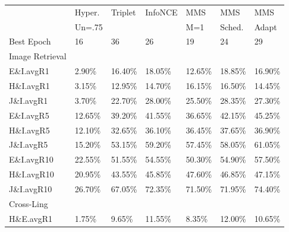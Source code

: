 
\begin{table}
    \centering
\begin{tabular}{l|llllll}
\toprule
{} & Hyper. & Triplet & InfoNCE & MMS & MMS & MMS \\
{} & Un=.75 &         &         & M=1 & Sched. & Adapt \\
\midrule
Best Epoch  &                   16 &                        36 &                      26 &            19 &                  24 &                  29 \\
\midrule
Image Retrieval &&&&&&\\
\midrule
\midrule
E\&I.avgR1   &                2.90\% &                    16.40\% &                  18.05\% &        12.65\% &              18.85\% &              16.90\% \\
H\&I.avgR1   &                3.15\% &                    12.95\% &                  14.70\% &        16.15\% &              16.50\% &              14.45\% \\
J\&I.avgR1   &                3.70\% &                    22.70\% &                  28.00\% &        25.50\% &              28.35\% &              27.30\% \\
\midrule
E\&I.avgR5   &               12.65\% &                    39.20\% &                  41.55\% &        36.65\% &              42.15\% &              45.25\% \\
H\&I.avgR5   &               12.10\% &                    32.65\% &                  36.10\% &        36.45\% &              37.65\% &              36.90\% \\
J\&I.avgR5   &               15.20\% &                    53.15\% &                  59.20\% &        57.45\% &              58.05\% &              61.05\% \\
\midrule
E\&I.avgR10  &               22.55\% &                    51.55\% &                  54.55\% &        50.30\% &              54.90\% &              57.50\% \\
H\&I.avgR10  &               20.95\% &                    43.55\% &                  45.85\% &        47.60\% &              46.85\% &              47.15\% \\
J\&I.avgR10  &               26.70\% &                    67.05\% &                  72.35\% &        71.50\% &              71.95\% &              74.40\% \\
\midrule
Cross-Ling &&&&&&\\
\midrule
\midrule
H\&E.avgR1   &                1.75\% &                     9.65\% &                  11.55\% &         8.35\% &              12.00\% &              10.65\% \\

\end{tabular}
\end{table}
